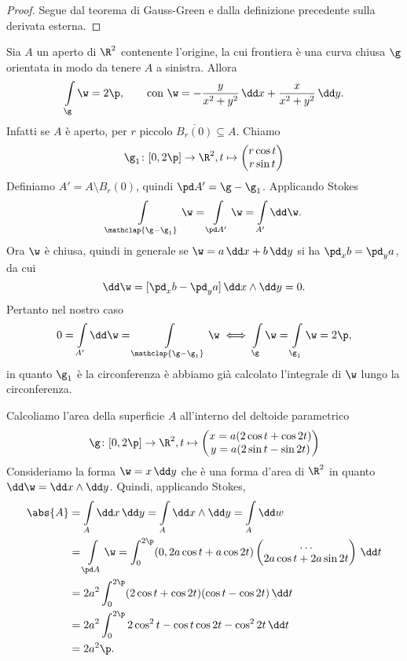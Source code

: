\begin{proof}
	Segue dal teorema di Gauss-Green e dalla definizione precedente sulla derivata esterna.
\end{proof}

\begin{ese}
	Sia \(A\) un aperto di \(\R^2\) contenente l'origine, la cui frontiera è una curva chiusa \(\g\) orientata in modo da tenere \(A\) a sinistra.
	Allora
	\[
		\int\limits_\g \w = 2\p, \qquad\text{con } \w = - \frac{y}{x^2+y^2}\,\dd x + \frac{x}{x^2+y^2}\,\dd y.
	\]
	Infatti se \(A\) è aperto, per \(r\) piccolo \(\overline{B_r(0)}\subseteq A\).
	Chiamo
	\[
		\g_1\colon [0,2\p] \to \R^2, t \mapsto \begin{pmatrix}r \cos t\\ r \sin t\end{pmatrix}
	\]
	Definiamo \(A' = A \setminus B_r(0)\), quindi \(\pd A' = \g - \g_1\).
	Applicando Stokes
	\[
		\int\limits_{\mathclap{\g-\g_1}} \w = \int\limits_{\pd A'} \w = \int\limits_{A'} \dd \w.
	\]
	Ora \(\w\) è chiusa, quindi in generale se \(\w = a\,\dd x + b\,\dd y\) si ha \(\pd_x b = \pd_y a\), da cui
	\[
		\dd \w = [\pd_x b - \pd_y a]\,\dd x \wedge \dd y = 0.
	\]
	Pertanto nel nostro caso
	\[
		0 = \int\limits_{A'} \dd \w = \int\limits_{\mathclap{\g-\g_1}} \w \iff \int\limits_\g \w = \int\limits_{\g_1} \w = 2\p,
	\]
	in quanto \(\g_1\) è la circonferenza è abbiamo già calcolato l'integrale di \(\w\) lungo la circonferenza.
\end{ese}

\begin{ese}
	Calcoliamo l'area della superficie \(A\) all'interno del deltoide parametrico
	\[
		\g\colon [0,2\p] \to \R^2, t \mapsto \begin{pmatrix}x = a(2\cos t + \cos 2t)\\ y = a(2\sin t - \sin 2t)\end{pmatrix}
	\]
	Consideriamo la forma \(\w = x\,\dd y\) che è una forma d'area di \(\R^2\) in quanto \(\dd \w = \dd x \wedge \dd y\).
	Quindi, applicando Stokes,
	\[
		\begin{split}
			\abs{A} & = \int\limits_A \dd x\,\dd y = \int\limits_A \dd x \wedge \dd y = \int\limits_A \dd w\\
			& = \int\limits_{\pd A} \w = \int_0^{2\p} (0,2a\cos t+a\cos 2t) \begin{pmatrix}\dots\\ 2a\cos t +2a\sin 2t\end{pmatrix}\,\dd t\\
			& = 2a^2 \int_0^{2\p} (2\cos t+\cos 2t)(\cos t-\cos 2t)\,\dd t\\
			& = 2a^2 \int_0^{2\p} 2\cos^2 t - \cos t\cos 2t - \cos^2 2t\,\dd t\\
			& = 2a^2 \p.
		\end{split}
	\]
\end{ese}
%
%
